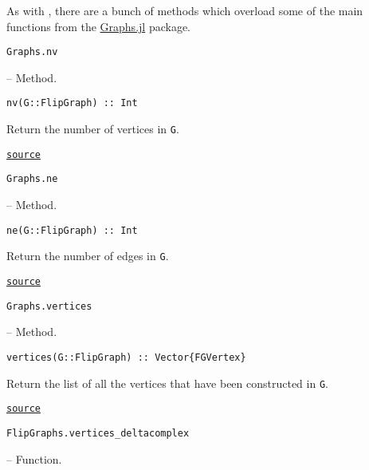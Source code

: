 \label{18181481596881829449}{}


As with , there are a bunch of methods which overload some of the main functions from the \href{https://juliagraphs.org/Graphs.jl/stable/}{Graphs.jl} package.


\hypertarget{13593568570027390357}{\texttt{Graphs.nv}}  -- {Method.}

\begin{adjustwidth}{2em}{0pt}


\begin{verbatim}
nv(G::FlipGraph) :: Int
\end{verbatim}

Return the number of vertices in \texttt{G}.



\href{https://github.com/schto223/FlipGraphs.jl/blob/e35d43698a06b86273148826b79d585ba04fcd26/src/flipGraph.jl#L228-L232}{\texttt{source}}


\end{adjustwidth}
\hypertarget{2573469596919273383}{\texttt{Graphs.ne}}  -- {Method.}

\begin{adjustwidth}{2em}{0pt}


\begin{verbatim}
ne(G::FlipGraph) :: Int
\end{verbatim}

Return the number of edges in \texttt{G}.



\href{https://github.com/schto223/FlipGraphs.jl/blob/e35d43698a06b86273148826b79d585ba04fcd26/src/flipGraph.jl#L221-L225}{\texttt{source}}


\end{adjustwidth}
\hypertarget{13164447363141201356}{\texttt{Graphs.vertices}}  -- {Method.}

\begin{adjustwidth}{2em}{0pt}


\begin{verbatim}
vertices(G::FlipGraph) :: Vector{FGVertex}
\end{verbatim}

Return the list of all the vertices that have been constructed in \texttt{G}.



\href{https://github.com/schto223/FlipGraphs.jl/blob/e35d43698a06b86273148826b79d585ba04fcd26/src/flipGraph.jl#L235-L239}{\texttt{source}}


\end{adjustwidth}
\hypertarget{2224360680418397816}{\texttt{FlipGraphs.vertices\_deltacomplex}}  -- {Function.}

